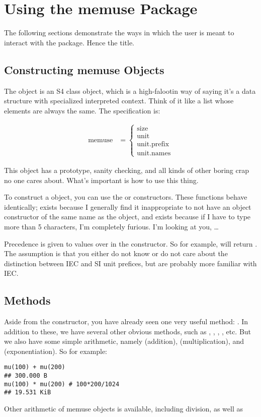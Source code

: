 \section{Using the memuse Package}

The following sections demonstrate the ways in which the user is meant to interact with the  package.  Hence the title.


\subsection{Constructing memuse Objects}

The  object is an S4 class object, which is a high-falootin way of saying it's a data structure with specialized interpreted context.  Think of it like a list whose elements are always the same.  The specification is:

\begin{align*}
  \text{memuse} &= 
  \begin{cases}
    \text{size}\\
    \text{unit}\\
    \text{unit.prefix}\\
    \text{unit.names}
  \end{cases}
\end{align*}

This object has a prototype, sanity checking, and all kinds of other boring crap no one cares about.  What's important is how to use this thing.

To construct a  object, you can use the  or  constructors.  These functions behave identically;  exists because I generally find it inappropriate to not have an object constructor of the same name as the object, and  exists because if I have to type more than 5 characters, I'm completely furious.  I'm looking at you, \dots

Precedence is given to  values over  in the constructor.  So for example,  will return .  The assumption is that you either do not know or do not care about the distinction between IEC and SI unit prefices, but are probably more familiar with IEC.



\subsection{Methods}
Aside from the constructor, you have already seen one very useful method:  .  In addition to these, we have several other obvious methods, such as , , , , etc.  But we also have some simple arithmetic, namely  (addition),  (multiplication), and  (exponentiation).  So for example:
\begin{lstlisting}[language=rr]
mu(100) + mu(200)
## 300.000 B
mu(100) * mu(200) # 100*200/1024
## 19.531 KiB
\end{lstlisting}
Other arithmetic of memuse objects is available, including division, as well as 

